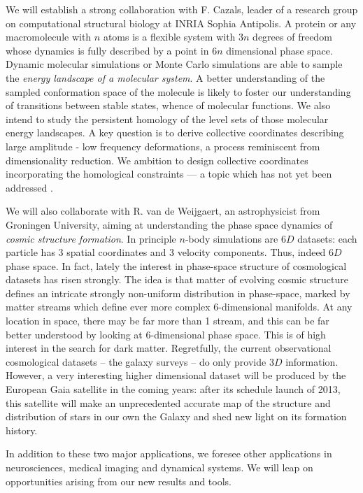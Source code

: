 We will establish a strong collaboration with F. Cazals, leader of a
research group on computational structural biology at INRIA Sophia
Antipolis. A protein or any macromolecule with $n$ atoms is a flexible
system with $3n$ degrees of freedom whose dynamics is fully described
by a point in $6n$ dimensional phase space. Dynamic molecular
simulations or Monte Carlo simulations are able to sample the {\em energy
landscape of a molecular system}. A better understanding of the
sampled conformation space of the molecule is likely to
foster our understanding of transitions between stable states,
whence of molecular functions.
We also intend to study the persistent homology
of the level sets of those molecular energy landscapes. A key question
 is to derive collective coordinates describing large amplitude -
low frequency deformations, a process reminiscent from dimensionality
reduction. We ambition to design collective coordinates incorporating
the homological constraints --- a topic which has not yet been
addressed \cite{djw-el-2003}. 

We will also collaborate with R. van de Weijgaert, an astrophysicist from
Groningen University, aiming at understanding the  phase space dynamics of
{\em cosmic structure formation}. In principle $n$-body simulations are
$6D$ datasets: each particle has 3 spatial coordinates and 3 velocity components.
Thus, indeed $6D$ phase space. In fact, lately the interest in phase-space structure
of cosmological datasets has risen strongly. The idea is that matter of evolving cosmic
structure defines an intricate strongly non-uniform distribution in phase-space,
marked by matter streams which define ever more complex $6$-dimensional
manifolds. At any location in space, there may be far more than 1 stream, and this
can be far better understood by looking at $6$-dimensional phase space. This is of high
interest in the search for dark matter. Regretfully, the current observational
cosmological datasets -- the galaxy surveys -- do only provide $3D$ information.
However, a very interesting higher dimensional dataset will be produced by
the European Gaia satellite in the coming years: after its schedule launch of 2013, this satellite
will make an unprecedented accurate map of the structure and distribution of
stars in our own the Galaxy and shed new light on its formation
history. 

In addition to these two major applications, we foresee other
applications in neurosciences, medical imaging and dynamical
systems. We will leap on opportunities arising from our new results
and tools.




